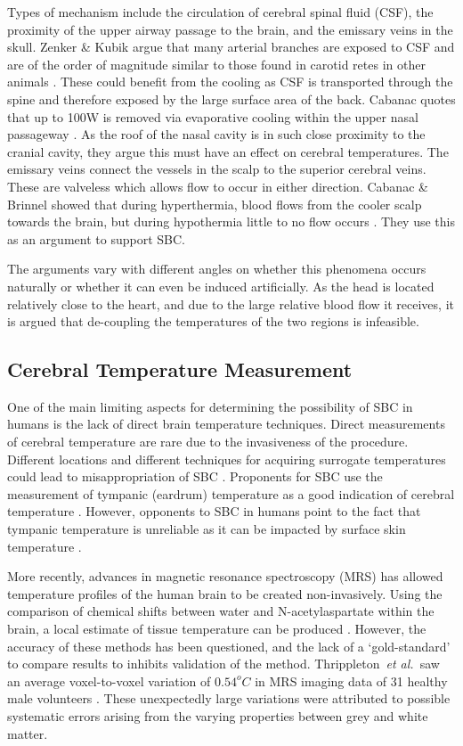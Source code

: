 \documentclass[11pt,english,a4paper,twoside,openright]{report}
\begin{document}
{{{{{{{{	Types of mechanism include the circulation of cerebral spinal fluid (CSF), the proximity of the upper airway passage to the brain, and the emissary veins in the skull. Zenker \& Kubik argue that many arterial branches are exposed to CSF and are of the order of magnitude similar to those found in carotid retes in other animals \cite{zenker1996brain}. These could benefit from the cooling as CSF is transported through the spine and therefore exposed by the large surface area of the back. Cabanac quotes that up to 100W is removed via evaporative cooling within the upper nasal passageway  \cite{cabanac1993selective}. As the roof of the nasal cavity is in such close proximity to the cranial cavity, they argue this must have an effect on cerebral temperatures. The emissary veins connect the vessels in the scalp to the superior cerebral veins. These are valveless which allows flow to occur in either direction. Cabanac \& Brinnel showed that during hyperthermia, blood flows from the cooler scalp towards the brain, but during hypothermia little to no flow occurs \cite{cabanac1985blood}. They use this as an argument to support SBC.
	
	The arguments vary with different angles on whether this phenomena occurs naturally or whether it can even be induced artificially. As the head is located relatively close to the heart, and due to the large relative blood flow it receives, it is argued that de-coupling the temperatures of the two regions is infeasible.
	
	\subsection{Cerebral Temperature Measurement}
	
	One of the main limiting aspects for determining the possibility of SBC in humans is the lack of direct brain temperature techniques. Direct measurements of cerebral temperature are rare due to the invasiveness of the procedure. Different locations and different techniques for acquiring surrogate temperatures could lead to misappropriation of SBC \cite{maloney2001rectal}. Proponents for SBC use the measurement of tympanic (eardrum) temperature as a good indication of cerebral temperature \cite{cabanac1979natural}. However, opponents to SBC in humans point to the fact that tympanic temperature is unreliable as it can be impacted by surface skin temperature \cite{nelson1998brain}.
	
	More recently, advances in magnetic resonance spectroscopy (MRS) has allowed temperature profiles of the human brain to be created non-invasively. Using the comparison of chemical shifts between water and N-acetylaspartate within the brain, a local estimate of tissue temperature can be produced \cite{cady1995estimation}. However, the accuracy of these methods has been questioned, and the lack of a `gold-standard' to compare results to inhibits validation of the method. Thrippleton~\textit{et al.\ }saw an average voxel-to-voxel variation of $0.54^{o}C$ in MRS imaging data of 31 healthy male volunteers  \cite{thrippleton2014reliability}. These unexpectedly large variations were attributed to possible systematic errors arising from the varying properties between grey and white matter.
	
}}}}}}}}
\end{document}
